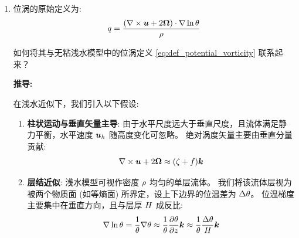 \begin{enumerate}
    通解形式:
    \begin{equation*}
        v(x) = C \cosh(\mu x) + D \sinh(\mu x)
    \end{equation*}

    代入边界条件
    \begin{itemize}
        \item $\left.v\right|_{x = 0} = C = 0$，通解形式简化为 $v(x) = D \sinh(\mu x)$。

        \item $\left.\pde{v}{x}\right|_{x = 0} = \mu D = \relvort_0$，$D = \frac{\relvort_0}{\mu}$。
    \end{itemize}

    得到东风条件下的解:
    \begin{equation*}
        v(x) = \relvort_0 \sqrt{-\frac{\bar{u}}{\rossby_0}} \sinh\left(\sqrt{-\frac{\rossby_0}{\bar{u}}} x\right)
    \end{equation*}

    此时，$v$ 随 $x$ 呈指数增长 (或衰减)，无法形成稳定的定常Rossby波。

    \item 位涡的原始定义为:
    \begin{equation*}
        q = \frac{(\nabla \times \bm{u} + 2\bm{\Omega}) \cdot \nabla \ln \theta}{\rho}
    \end{equation*}

    如何将其与无粘浅水模型中的位涡定义 \eqref{eq:def_potential_vorticity} 联系起来？

    \vspace{1em}
    \textbf{推导:}

    在浅水近似下，我们引入以下假设:
    \begin{enumerate}
        \item \textbf{柱状运动与垂直矢量主导}:
        由于水平尺度远大于垂直尺度，且流体满足静力平衡，水平速度 $\bm{u}_h$ 随高度变化可忽略。
        绝对涡度矢量主要由垂直分量贡献:
        \begin{equation*}
            \nabla \times \bm{u} + 2\bm{\Omega} \approx (\zeta + f) \bm{k}
        \end{equation*}

        \item \textbf{层结近似}:
        浅水模型可视作密度 $\rho$ 均匀的单层流体。
        我们将该流体层视为被两个物质面 (如等熵面) 所界定，设上下边界的位温差为 $\Delta \theta$。
        位温梯度主要集中在垂直方向，且与层厚 $H$ 成反比:
        \begin{equation*}
            \nabla \ln \ptemp = \frac{1}{\ptemp} \nabla \ptemp \approx \frac{1}{\ptemp} \pde{\ptemp}{z} \kvec \approx \frac{1}{\ptemp} \frac{\Delta \ptemp}{\depth} \kvec
        \end{equation*}
    \end{enumerate}


\end{enumerate}
